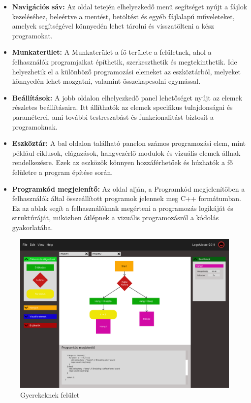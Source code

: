 \documentclass{article}
\begin{document}
\begin{itemize}
\item \textbf{Navigációs sáv:} 
Az oldal tetején elhelyezkedő menü segítséget nyújt a fájlok kezeléséhez, beleértve a mentést, betöltést és egyéb fájlalapú műveleteket, amelyek segítségével könnyedén lehet tárolni és visszatölteni a kész programokat.
\item \textbf{Munkaterület:}
A Munkaterület a fő területe a felületnek, ahol a felhasználók programjaikat építhetik, szerkeszthetik és megtekinthetik. Ide helyezhetik el a különböző programozási elemeket az eszköztárból, melyeket könnyedén lehet mozgatni, valamint összekapcsolni egymással.
\item \textbf{Beállítások:} 
A jobb oldalon elhelyezkedő panel lehetőséget nyújt az elemek részletes beállításaira. Itt állíthatók az elemek specifikus tulajdonságai és paraméterei, ami további testreszabást és funkcionalitást biztosít a programoknak.
\item \textbf{Eszköztár:}
A bal oldalon található panelon számos programozási elem, mint például ciklusok, elágazások, hangvezérlő modulok és vizuális elemek állnak rendelkezésre. Ezek az eszközök könnyen hozzáférhetőek és húzhatók a fő felületre a program építése során.
\item \textbf{Programkód megjelenítő:}
Az oldal alján, a Programkód megjelenítőben a felhasználók által összeállított programok jelennek meg C++ formátumban. Ez az ablak segít a felhasználóknak megérteni a programozás logikáját és struktúráját, miközben átlépnek a vizuális programozásról a kódolás gyakorlatába.
\end{itemize}

\begin{figure}[H]
\centering
\includegraphics[width=1\linewidth]{gyerekeknek-felulet.png}
\caption{\label{fig:image}Gyerekeknek felület}
\end{figure}
\end{document}
